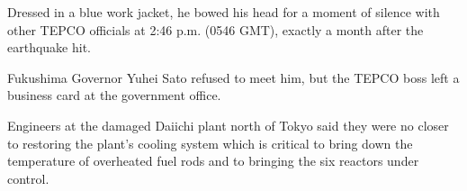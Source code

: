 Dressed in a blue work jacket, he bowed his head for a moment of silence with other TEPCO officials at 2:46 p.m. (0546 GMT), exactly a month after the earthquake hit.

Fukushima Governor Yuhei Sato refused to meet him, but the TEPCO boss left a business card at the government office.

Engineers at the damaged Daiichi plant north of Tokyo said they were no closer to restoring the plant's cooling system which is critical to bring down the temperature of overheated fuel rods and to bringing the six reactors under control.

